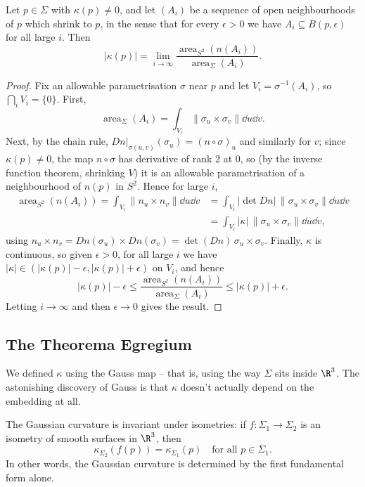 \begin{theorem}\label{thm:curvaturearea}
    Let $p \in \Sigma$ with $\kappa(p) \neq 0$, and let $(A_i)$ be a sequence of open neighbourhoods of $p$ which shrink to $p$, in the sense that for every $\epsilon > 0$ we have $A_i \subseteq B(p, \epsilon)$ for all large $i$. Then
    $$
    |\kappa(p)| = \lim_{i \rightarrow \infty} \frac{\operatorname{area}_{S^2}(n(A_i))}{\operatorname{area}_\Sigma(A_i)}.
    $$
\end{theorem}
\begin{proof}
    Fix an allowable parametrisation $\sigma$ near $p$ and let $V_i = \sigma^{-1}(A_i)$, so $\bigcap_i V_i = \{0\}$. First,
    $$
    \operatorname{area}_\Sigma(A_i) = \int_{V_i} \|\sigma_u \times \sigma_v\| \dd u \dd v.
    $$
    Next, by the chain rule, $\left.Dn\right|_{\sigma(u,v)}(\sigma_u) = (n \circ \sigma)_u$ and similarly for $v$; since $\kappa(p) \neq 0$, the map $n \circ \sigma$ has derivative of rank 2 at $0$, so (by the inverse function theorem, shrinking $V$) it is an allowable parametrisation of a neighbourhood of $n(p)$ in $S^2$. Hence for large $i$,
    \begin{align*}
    \operatorname{area}_{S^2}(n(A_i)) = \int_{V_i} \|n_u \times n_v\| \dd u \dd v &= \int_{V_i} |{\det Dn}| \, \|\sigma_u \times \sigma_v\| \dd u \dd v \\
    &= \int_{V_i} |\kappa| \, \|\sigma_u \times \sigma_v\| \dd u \dd v,
    \end{align*}
    using $n_u \times n_v = Dn(\sigma_u) \times Dn(\sigma_v) = \det(Dn) \, \sigma_u \times \sigma_v$.
    Finally, $\kappa$ is continuous, so given $\epsilon > 0$, for all large $i$ we have $|\kappa| \in (|\kappa(p)| - \epsilon, |\kappa(p)| + \epsilon)$ on $V_i$, and hence
    $$
    |\kappa(p)| - \epsilon \leq \frac{\operatorname{area}_{S^2}(n(A_i))}{\operatorname{area}_\Sigma(A_i)} \leq |\kappa(p)| + \epsilon.
    $$
    Letting $i \rightarrow \infty$ and then $\epsilon \rightarrow 0$ gives the result.
\end{proof}

\subsection{The Theorema Egregium}

We defined $\kappa$ using the Gauss map -- that is, using the way $\Sigma$ sits inside $\R^3$. The astonishing discovery of Gauss is that $\kappa$ doesn't actually depend on the embedding at all.

\begin{theorem}\label{thm:egregium}
    The Gaussian curvature is invariant under isometries: if $f: \Sigma_1 \rightarrow \Sigma_2$ is an isometry of smooth surfaces in $\R^3$, then
    $$
    \kappa_{\Sigma_2}(f(p)) = \kappa_{\Sigma_1}(p) \quad \text{for all } p \in \Sigma_1.
    $$
    In other words, the Gaussian curvature is determined by the first fundamental form alone.
\end{theorem}

